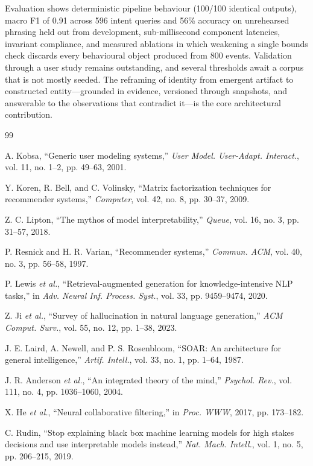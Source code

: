 \documentclass[conference]{IEEEtran}
\begin{document}
Evaluation shows deterministic pipeline behaviour (100/100 identical outputs), macro F1 of 0.91 across 596 intent queries and 56\% accuracy on unrehearsed phrasing held out from development, sub-millisecond component latencies, invariant compliance, and measured ablations in which weakening a single bounds check discards every behavioural object produced from 800 events. Validation through a user study remains outstanding, and several thresholds await a corpus that is not mostly seeded. The reframing of identity from emergent artifact to constructed entity---grounded in evidence, versioned through snapshots, and answerable to the observations that contradict it---is the core architectural contribution.

\begin{thebibliography}{99}

A. Kobsa, ``Generic user modeling systems,'' \emph{User Model. User-Adapt. Interact.}, vol. 11, no. 1--2, pp. 49--63, 2001.

Y. Koren, R. Bell, and C. Volinsky, ``Matrix factorization techniques for recommender systems,'' \emph{Computer}, vol. 42, no. 8, pp. 30--37, 2009.

Z. C. Lipton, ``The mythos of model interpretability,'' \emph{Queue}, vol. 16, no. 3, pp. 31--57, 2018.

P. Resnick and H. R. Varian, ``Recommender systems,'' \emph{Commun. ACM}, vol. 40, no. 3, pp. 56--58, 1997.

P. Lewis \emph{et al.}, ``Retrieval-augmented generation for knowledge-intensive NLP tasks,'' in \emph{Adv. Neural Inf. Process. Syst.}, vol. 33, pp. 9459--9474, 2020.

Z. Ji \emph{et al.}, ``Survey of hallucination in natural language generation,'' \emph{ACM Comput. Surv.}, vol. 55, no. 12, pp. 1--38, 2023.

J. E. Laird, A. Newell, and P. S. Rosenbloom, ``SOAR: An architecture for general intelligence,'' \emph{Artif. Intell.}, vol. 33, no. 1, pp. 1--64, 1987.

J. R. Anderson \emph{et al.}, ``An integrated theory of the mind,'' \emph{Psychol. Rev.}, vol. 111, no. 4, pp. 1036--1060, 2004.

X. He \emph{et al.}, ``Neural collaborative filtering,'' in \emph{Proc. WWW}, 2017, pp. 173--182.

C. Rudin, ``Stop explaining black box machine learning models for high stakes decisions and use interpretable models instead,'' \emph{Nat. Mach. Intell.}, vol. 1, no. 5, pp. 206--215, 2019.


\end{thebibliography}
\end{document}
